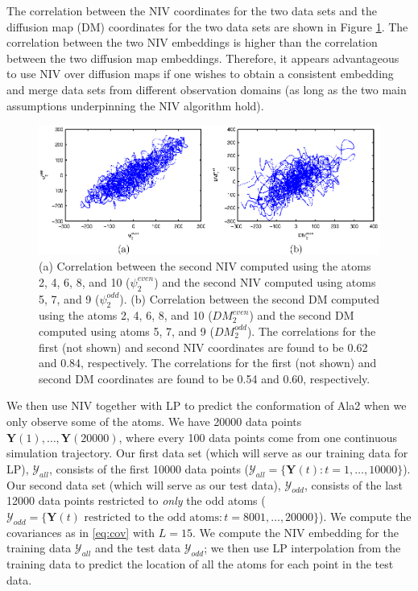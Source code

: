 The correlation between the NIV coordinates for the two data sets and the diffusion map (DM) coordinates for the two data sets are shown in Figure \ref{fig:ala_corr}.
%
The correlation between the two NIV embeddings is higher than the correlation between the two diffusion map embeddings.
Therefore, it appears advantageous to use NIV over diffusion maps if one wishes to obtain a consistent embedding and merge data sets from different observation domains (as long as the two main assumptions underpinning the NIV algorithm hold).

\begin{figure}[t]
    \includegraphics[width=6in]{fig7}
    \caption[Comparison of intrinsic variable and diffusion maps embeddings for alanine dipeptide data]{(a) Correlation between the second NIV computed using the atoms 2, 4, 6, 8, and 10 ($\psi_2^{even}$) and the second NIV computed using atoms 5, 7, and 9 ($\psi_2^{odd}$).
    (b) Correlation between the second DM computed using the atoms 2, 4, 6, 8, and 10 ($DM_2^{even}$) and the second DM computed using atoms 5, 7, and 9 ($DM_2^{odd}$).
    The correlations for the first (not shown) and second NIV coordinates are found to be 0.62 and 0.84, respectively.
    The correlations for the first (not shown) and second DM coordinates are found to be 0.54 and 0.60, respectively. }
    \label{fig:ala_corr}
\end{figure}

We then use NIV together with LP to predict the conformation of Ala2 when we only observe some of the atoms.
%
We have 20000 data points $\mathbf{Y}(1), \dots, \mathbf{Y}(20000)$, where every 100 data points come from one continuous simulation trajectory.
%
Our first data set (which will serve as our training data for LP), $\mathcal{Y}_{all}$,
consists of the first 10000 data points ($\mathcal{Y}_{all} = \{\mathbf{Y}(t): t=1, \dots, 10000\}$).
%
Our second data set (which will serve as our test data), $\mathcal{Y}_{odd}$, consists of the last 12000 data points restricted to {\em only} the odd atoms
($\mathcal{Y}_{odd} = \{ \mathbf{Y}(t) \text{ restricted to the odd atoms}: t = 8001, \dots, 20000\}$).
%
We compute the covariances as in \eqref{eq:cov} with $L=15$.
%
We compute the NIV embedding for the training data $\mathcal{Y}_{all}$ and the test data $\mathcal{Y}_{odd}$; we then use LP interpolation from the training data to predict the location of all the atoms for each point in the test data.

